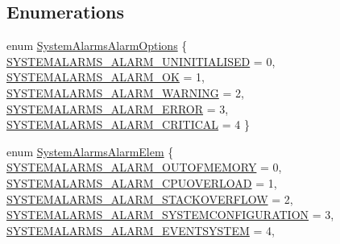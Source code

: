 \subsection*{\-Enumerations}
\begin{DoxyCompactItemize}
\item 
enum \hyperlink{group___system_alarms_ga3febc1d561b4dbb1a7b3676723285e50}{\-System\-Alarms\-Alarm\-Options} \{ \*
\hyperlink{group___system_alarms_gga3febc1d561b4dbb1a7b3676723285e50af3c79497d2bcccf401eff89f70375ba4}{\-S\-Y\-S\-T\-E\-M\-A\-L\-A\-R\-M\-S\-\_\-\-A\-L\-A\-R\-M\-\_\-\-U\-N\-I\-N\-I\-T\-I\-A\-L\-I\-S\-E\-D} = 0, 
\hyperlink{group___system_alarms_gga3febc1d561b4dbb1a7b3676723285e50a1536df112d859a4d4ac249d19306e27f}{\-S\-Y\-S\-T\-E\-M\-A\-L\-A\-R\-M\-S\-\_\-\-A\-L\-A\-R\-M\-\_\-\-O\-K} = 1, 
\hyperlink{group___system_alarms_gga3febc1d561b4dbb1a7b3676723285e50abb6aa2fb4496644eff964307bda346a2}{\-S\-Y\-S\-T\-E\-M\-A\-L\-A\-R\-M\-S\-\_\-\-A\-L\-A\-R\-M\-\_\-\-W\-A\-R\-N\-I\-N\-G} = 2, 
\hyperlink{group___system_alarms_gga3febc1d561b4dbb1a7b3676723285e50ab46f066354d09c11cb49dabd46aa9ea0}{\-S\-Y\-S\-T\-E\-M\-A\-L\-A\-R\-M\-S\-\_\-\-A\-L\-A\-R\-M\-\_\-\-E\-R\-R\-O\-R} = 3, 
\*
\hyperlink{group___system_alarms_gga3febc1d561b4dbb1a7b3676723285e50a1cdd59008fd4ac3c2ba164b8ab44dee7}{\-S\-Y\-S\-T\-E\-M\-A\-L\-A\-R\-M\-S\-\_\-\-A\-L\-A\-R\-M\-\_\-\-C\-R\-I\-T\-I\-C\-A\-L} = 4
 \}
\item 
enum \hyperlink{group___system_alarms_ga00a6e22ba79966c55dc043860127ed4d}{\-System\-Alarms\-Alarm\-Elem} \{ \*
\hyperlink{group___system_alarms_gga00a6e22ba79966c55dc043860127ed4da89c7b1fd0eeedbaf147a6a26313e2113}{\-S\-Y\-S\-T\-E\-M\-A\-L\-A\-R\-M\-S\-\_\-\-A\-L\-A\-R\-M\-\_\-\-O\-U\-T\-O\-F\-M\-E\-M\-O\-R\-Y} = 0, 
\hyperlink{group___system_alarms_gga00a6e22ba79966c55dc043860127ed4da722abf5a61b17a9036719ced28433bb2}{\-S\-Y\-S\-T\-E\-M\-A\-L\-A\-R\-M\-S\-\_\-\-A\-L\-A\-R\-M\-\_\-\-C\-P\-U\-O\-V\-E\-R\-L\-O\-A\-D} = 1, 
\hyperlink{group___system_alarms_gga00a6e22ba79966c55dc043860127ed4da92bccb549dce3a61687aa82a744a121e}{\-S\-Y\-S\-T\-E\-M\-A\-L\-A\-R\-M\-S\-\_\-\-A\-L\-A\-R\-M\-\_\-\-S\-T\-A\-C\-K\-O\-V\-E\-R\-F\-L\-O\-W} = 2, 
\hyperlink{group___system_alarms_gga00a6e22ba79966c55dc043860127ed4dae7f9de52b544cb94b66bdf038395e273}{\-S\-Y\-S\-T\-E\-M\-A\-L\-A\-R\-M\-S\-\_\-\-A\-L\-A\-R\-M\-\_\-\-S\-Y\-S\-T\-E\-M\-C\-O\-N\-F\-I\-G\-U\-R\-A\-T\-I\-O\-N} = 3, 
\*
\hyperlink{group___system_alarms_gga00a6e22ba79966c55dc043860127ed4dab5cc42851c82f15c0e751e29cecac77f}{\-S\-Y\-S\-T\-E\-M\-A\-L\-A\-R\-M\-S\-\_\-\-A\-L\-A\-R\-M\-\_\-\-E\-V\-E\-N\-T\-S\-Y\-S\-T\-E\-M} = 4, 

\end{DoxyCompactItemize}
